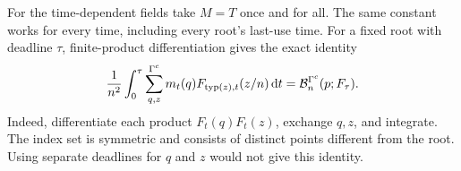 For the time-dependent fields take \(M=T\) once and for all. The same
constant works for every time, including every root's last-use time.
For a fixed root with deadline \(\tau\), finite-product differentiation
gives the exact identity
\begin{equation}\label{eq:timesym}
 \frac1{n^2}\int_0^\tau\sum_{q,z}^{\Gamma^c}m_t(q)F_{\operatorname{typ}(z),t}(z/n)\,\mathrm d t
 =\mathcal B_n^{\Gamma^c}(p;F_\tau).
\end{equation}
Indeed, differentiate each product \(F_t(q)F_t(z)\), exchange \(q,z\),
and integrate. The index set is symmetric and consists of distinct
points different from the root. Using separate deadlines for \(q\)
and \(z\) would not give this identity.

